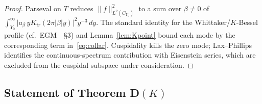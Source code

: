 \documentclass[11pt]{amsart}
\theoremstyle{definition}
\newcommand{\abs}[1]{\lvert#1\rvert}
\newcommand{\norm}[1]{\lVert#1\rVert}
\begin{document}
\begin{proof}
Parseval on $T$ reduces $\norm{f}_{L^2(C_{Y_0})}^2$ to a sum over
$\beta\neq 0$ of $\int_{Y_0}^\infty\abs{a_\beta\,y K_{ir}(2\pi\abs{\beta}y)}^2 y^{-3}\,dy$.
The standard identity for the Whittaker/$K$-Bessel profile
(cf.\ EGM~\cite{EGM}~\S3) and Lemma~\ref{lem:Kpoint} bound each mode by
the corresponding term in~\eqref{eq:collar}.  Cuspidality kills the zero
mode; Lax--Phillips~\cite{LP} identifies the continuous-spectrum
contribution with Eisenstein series, which are excluded from the cuspidal
subspace under consideration.
\end{proof}

\subsection{Statement of Theorem D$(K)$}
\end{document}
